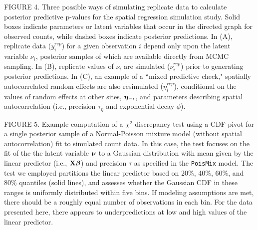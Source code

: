 \documentclass[12pt,english]{article}
\begin{document}
\begin{spacing}{1.9}
    FIGURE 4.  Three possible ways of simulating replicate data to
    calculate posterior predictive p-values for the spatial regression
    simulation study. Solid boxes indicate parameters or latent
    variables that occur in the directed graph for observed counts,
    while dashed boxes indicate posterior predictions.  In (A),
    replicate data ($y_i^{rep}$) for a given observation $i$ depend
    only upon the latent variable $\nu_i$, posterior samples of which
    are available directly from MCMC sampling.  In (B), replicate
    values of $\nu_i$ are simulated ($\nu_i^{rep}$) prior to
    generating posterior predictions.  In (C), an example of a ``mixed
    predictive check," spatially autocorrelated random effects are
    also resimulated ($\eta_i^{rep}$), conditional on the values of
    random effects at other sites, $\boldsymbol{\eta}_{-i}$, and parameters
    describing spatial autocorrelation (i.e., precision $\tau_\eta$ and exponential
    decay $\phi$).

    FIGURE 5.  Example computation of a $\chi^2$ discrepancy test
    using a CDF pivot for a single posterior sample of a
    Normal-Poisson mixture model (without spatial autocorrelation) fit
    to simulated count data.  In this case, the test focuses on the
    fit of the the latent variable $\boldsymbol{\nu}$ to a Gaussian distribution
    with mean given by the linear predictor (i.e., ${\bf X}\boldsymbol{\beta}$) and
    precision $\tau$ as specified in the \texttt{PoisMix} model. The
    test we employed partitions the linear predictor based on 20\%,
    40\%, 60\%, and 80\% quantiles (solid lines), and assesses whether
    the Gaussian CDF in these ranges is uniformly distributed within
    five bins.  If modeling assumptions are met, there should be a
    roughly equal number of observations in each bin.  For the data
    presented here, there appears to underpredictions at low and high
    values of the linear predictor.


\end{spacing}
\end{document}
